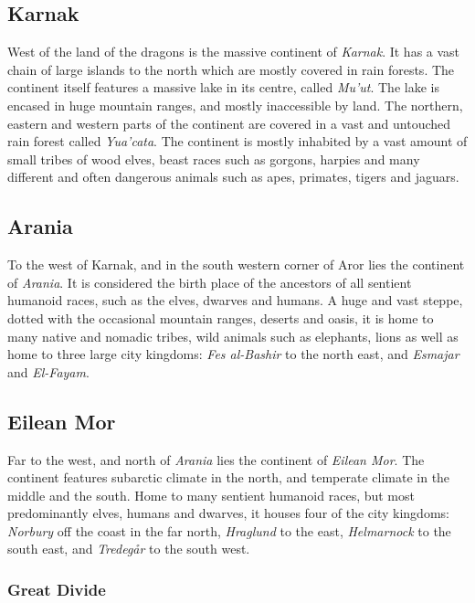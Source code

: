 \subsection{Karnak}

West of the land of the dragons is the massive continent of \emph{Karnak}. It
has a vast chain of large islands to the north which are mostly covered in
rain forests. The continent itself features a massive lake in its centre,
called \emph{Mu'ut}. The lake is encased in huge mountain ranges, and mostly
inaccessible by land. The northern, eastern and western parts of the continent
are covered in a vast and untouched rain forest called \emph{Yua'cata}. The
continent is mostly inhabited by a vast amount of small tribes of wood elves,
beast races such as gorgons, harpies and many different and often dangerous
animals such as apes, primates, tigers and jaguars.

\subsection{Arania}

To the west of Karnak, and in the south western corner of Aror lies the
continent of \emph{Arania}. It is considered the birth place of the ancestors
of all sentient humanoid races, such as the elves, dwarves and humans. A huge
and vast steppe, dotted with the occasional mountain ranges, deserts and oasis,
it is home to many native and nomadic tribes, wild animals such as elephants,
lions as well as home to three large city kingdoms: \emph{Fes al-Bashir} to
the north east, and \emph{Esmajar} and \emph{El-Fayam}.

\subsection{Eilean Mor}

Far to the west, and north of \emph{Arania} lies the continent of \emph{Eilean
  Mor}. The continent features subarctic climate in the north, and
temperate climate in the middle and the south. Home to many sentient humanoid
races, but most predominantly elves, humans and dwarves, it houses four of the
city kingdoms: \emph{Norbury} off the coast in the far north, \emph{Hraglund}
to the east, \emph{Helmarnock} to the south east, and \emph{Tredegår} to the
south west.

\subsubsection{Great Divide}
\label{sec:Great Divide}

